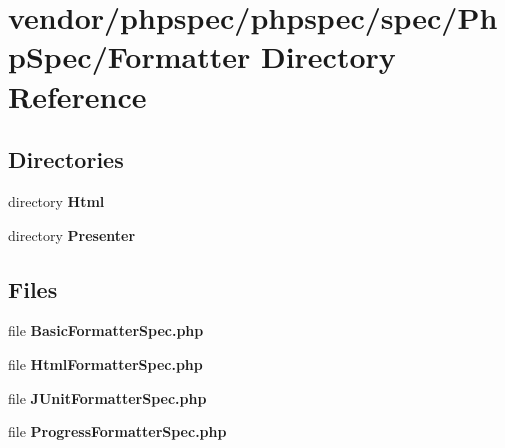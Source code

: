 \section{vendor/phpspec/phpspec/spec/\+Php\+Spec/\+Formatter Directory Reference}
\label{dir_38e7b7d16aae7d512d2a419c3928391a}
\subsection*{Directories}
\begin{DoxyCompactItemize}
\item 
directory {\bf Html}
\item 
directory {\bf Presenter}
\end{DoxyCompactItemize}
\subsection*{Files}
\begin{DoxyCompactItemize}
\item 
file {\bf Basic\+Formatter\+Spec.\+php}
\item 
file {\bf Html\+Formatter\+Spec.\+php}
\item 
file {\bf J\+Unit\+Formatter\+Spec.\+php}
\item 
file {\bf Progress\+Formatter\+Spec.\+php}
\end{DoxyCompactItemize}
